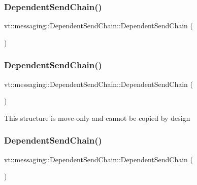 \subsubsection{\texorpdfstring{Dependent\+Send\+Chain()}{DependentSendChain()}\hspace{0.1cm}{\footnotesize\ttfamily [1/3]}}
{\footnotesize\ttfamily vt\+::messaging\+::\+Dependent\+Send\+Chain\+::\+Dependent\+Send\+Chain (\begin{DoxyParamCaption}{ }\end{DoxyParamCaption})\hspace{0.3cm}{\ttfamily [inline]}}

\mbox{\label{classvt_1_1messaging_1_1_dependent_send_chain_a64a4bc71711110632e2056380a603005}} 
\subsubsection{\texorpdfstring{Dependent\+Send\+Chain()}{DependentSendChain()}\hspace{0.1cm}{\footnotesize\ttfamily [2/3]}}
{\footnotesize\ttfamily vt\+::messaging\+::\+Dependent\+Send\+Chain\+::\+Dependent\+Send\+Chain (\begin{DoxyParamCaption}\item[{const \hyperlink{classvt_1_1messaging_1_1_dependent_send_chain}{Dependent\+Send\+Chain} \&}]{ }\end{DoxyParamCaption})\hspace{0.3cm}{\ttfamily [delete]}}

This structure is move-\/only and cannot be copied by design \mbox{\label{classvt_1_1messaging_1_1_dependent_send_chain_a74e4a9681e4103eb6f3175d01de19f16}} 
\subsubsection{\texorpdfstring{Dependent\+Send\+Chain()}{DependentSendChain()}\hspace{0.1cm}{\footnotesize\ttfamily [3/3]}}
{\footnotesize\ttfamily vt\+::messaging\+::\+Dependent\+Send\+Chain\+::\+Dependent\+Send\+Chain (\begin{DoxyParamCaption}\item[{\hyperlink{classvt_1_1messaging_1_1_dependent_send_chain}{Dependent\+Send\+Chain} \&\&}]{ }\end{DoxyParamCaption})\hspace{0.3cm}{\ttfamily [default]}}

